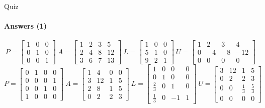 \documentclass[aspectratio=169]{beamer}
\begin{document}
\begin{frame}[t]{Quiz}
\framesubtitle{Answers (1)}
\setcounter{equation}{0}
\begin{equation}
    P=\begin{bmatrix}
    1 & 0 & 0 \\
    0 & 1 & 0 \\ 
    0 & 0  & 1 
    \end{bmatrix}\ A=\begin{bmatrix}
        1 & 2 & 3 & 5  \\
        2 & 4 & 8 & 12 \\
        3 & 6 & 7 & 13
    \end{bmatrix}\ L=\begin{bmatrix}
    1 & 0 & 0 \\
    5 & 1 & 0 \\ 
    9 & 2  & 1 
    \end{bmatrix}\ U=\begin{bmatrix}
    1 & 2 & 3 & 4\\
    0 & -4 & -8 & -12\\ 
    0 & 0  & 0 & 0 
    \end{bmatrix}
\end{equation}
\begin{equation}
    P=\begin{bmatrix}
    0 & 1 & 0 & 0 \\
    0 & 0 & 0 & 1\\ 
    0 & 0  & 1 & 0 \\
    1 & 0 & 0 & 0 
    \end{bmatrix}\ A=\begin{bmatrix}
        1 & 4  & 0 & 0 \\
        3 & 12 & 1 & 5 \\
        2 & 8  & 1 & 5 \\
        0 & 2  & 2 & 3
    \end{bmatrix}\ L=\begin{bmatrix}
    1 & 0 & 0 & 0 \\
    0 & 1 & 0 & 0\\ 
    \frac{2}{3} & 0  & 1 & 0 \\ 
    \frac{1}{3} & 0 & -1 & 1 
    \end{bmatrix}\ U=\begin{bmatrix}
    3 & 12 & 1 & 5\\
    0 & 2 & 2 & 3\\ 
    0 & 0  & \frac{1}{3} & \frac{5}{3}\\
    0 & 0 & 0 & 0 
    \end{bmatrix}
\end{equation}
\end{frame}
\end{document}
